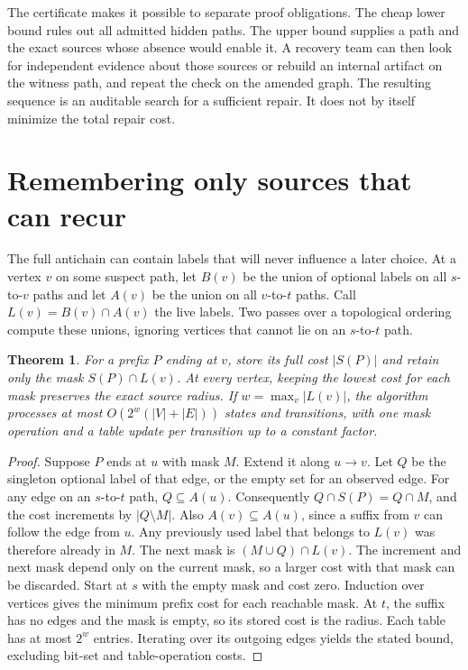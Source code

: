 \documentclass[11pt]{article}
\newtheorem{theorem}{Theorem}
\begin{document}
The certificate makes it possible to separate proof obligations.
The cheap lower bound rules out all admitted hidden paths. The
upper bound supplies a path and the exact sources whose absence
would enable it. A recovery team can then look for independent
evidence about those sources or rebuild an internal artifact on
the witness path, and repeat the check on the amended graph.
The resulting sequence is an auditable search for a sufficient
repair. It does not by itself minimize the total repair cost.

\section{Remembering only sources that can recur}
The full antichain can contain labels that will never influence
a later choice. At a vertex $v$ on some suspect path, let $B(v)$ be
the union of optional labels on all $s$-to-$v$ paths and let $A(v)$
be the union on all $v$-to-$t$ paths. Call
$L(v)=B(v)\cap A(v)$ the live labels. Two passes over a topological
ordering compute these unions, ignoring vertices that cannot lie
on an $s$-to-$t$ path.

\begin{theorem}
For a prefix $P$ ending at $v$, store its full cost $|S(P)|$ and
retain only the mask $S(P)\cap L(v)$. At every vertex, keeping the
lowest cost for each mask preserves the exact source radius.
If $w=\max_v|L(v)|$, the algorithm processes at most
$O(2^w(|V|+|E|))$ states and transitions, with one mask operation
and a table update per transition up to a constant factor.
\end{theorem}
\begin{proof}
Suppose $P$ ends at $u$ with mask $M$. Extend it along $u\to v$.
Let $Q$ be the singleton optional label of that edge, or the empty
set for an observed edge. For any edge on an $s$-to-$t$ path,
$Q\subseteq A(u)$. Consequently $Q\cap S(P)=Q\cap M$, and
the cost increments by $|Q\setminus M|$. Also
$A(v)\subseteq A(u)$, since a suffix from $v$ can follow the edge
from $u$. Any previously used label that belongs to $L(v)$ was
therefore already in $M$. The next mask is
$(M\cup Q)\cap L(v)$. The increment and next mask depend only
on the current mask, so a larger cost with that mask can be
discarded. Start at $s$ with the empty mask and cost zero.
Induction over vertices gives the minimum prefix cost for each
reachable mask. At $t$, the suffix has no edges and the mask
is empty, so its stored cost is the radius. Each table has at
most $2^w$ entries. Iterating over its outgoing edges yields
the stated bound, excluding bit-set and table-operation costs.
\end{proof}
\end{document}
